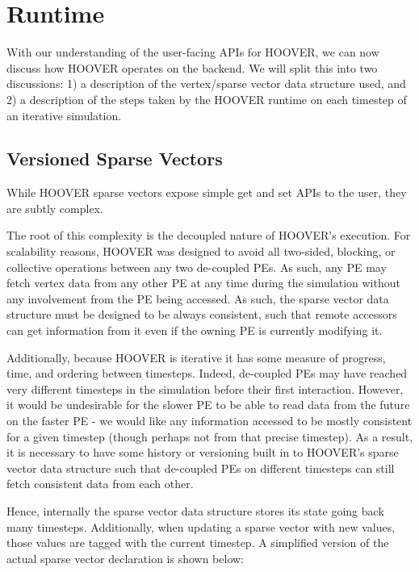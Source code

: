 \section{Runtime}

With our understanding of the user-facing APIs for HOOVER, we can now discuss
how HOOVER operates on the backend. We will split this into two discussions: 1)
a description of the vertex/sparse vector data structure used, and 2) a
description of the steps taken by the HOOVER runtime on each timestep of
an iterative simulation.

\subsection{Versioned Sparse Vectors}

While HOOVER sparse vectors expose simple get and set APIs to the user, they
are subtly complex.

The root of this complexity is the decoupled nature of HOOVER's execution. For
scalability reasons, HOOVER was designed to avoid all two-sided, blocking, or
collective operations between any two de-coupled PEs. As such, any PE may
fetch vertex data from any other PE at any time during the simulation without
any involvement from the PE being accessed. As such, the sparse vector data
structure must be designed to be always consistent, such that remote accessors
can get information from it even if the owning PE is currently modifying it.

Additionally, because HOOVER is iterative it has some measure of progress, time,
and ordering between timesteps. Indeed, de-coupled PEs may have
reached very different timesteps in the simulation before their first
interaction. However, it would be undesirable for the slower PE to be able to
read data from the future on the faster PE - we would like any information
accessed to be mostly consistent for a given timestep (though perhaps not from
that precise timestep). As a result, it is necessary to have some history or
versioning built in to HOOVER's sparse vector data structure such that
de-coupled PEs on different timesteps can still fetch consistent data from each
other.

Hence, internally the sparse vector data structure stores its state going back
many timesteps. Additionally, when updating a sparse vector with new values,
those values are tagged with the current timestep. A simplified version of the
actual sparse vector declaration is shown below:

